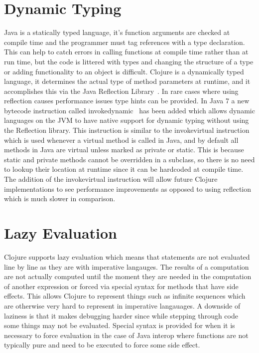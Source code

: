 \section{Dynamic Typing}
Java is a statically typed language, it's function arguments are checked at compile time and the programmer must tag references with a type declaration. This can help to catch errors in calling functions at compile time rather than at run time, but the code is littered with types and changing the structure of a type or adding functionality to an object is difficult.  
Clojure is a dynamically typed language, it determines the actual type of method parameters at runtime, and it accomplishes this via the Java Reflection Library~\cite{reflection}. In rare cases where using reflection causes performance issues type hints can be provided. In Java 7 a new bytecode instruction called invokedynamic~\cite{invokedynamic} has been added which allows dynamic languages on the JVM to have native support for dynamic typing without using the Reflection library. This instruction is similar to the invokevirtual instruction which is used whenever a virtual method is called in Java, and by default all methods in Java are virtual unless marked as private or static. This is because static and private methods cannot be overridden in a subclass, so there is no need to lookup their location at runtime since it can be hardcoded at compile time. The addition of the invokevirtual instruction will allow future Clojure implementations to see performance improvements as opposed to using reflection which is much slower in comparison.  

\section{Lazy Evaluation}
Clojure supports lazy evaluation which means that statements are not evaluated line by line as they are with imperative langauges. The results of a computation are not actually computed until the moment they are needed in the computation of another expression or forced via special syntax for methods that have side effects. This allows Clojure to represent things such as infinite sequences which are otherwise very hard to represent in imperative langauages. A downside of laziness is that it makes debugging harder since while stepping through code some things may not be evaluated. Special syntax is provided for when it is necessary to force evaluation in the case of Java interop where functions are not typically pure and need to be executed to force some side effect.

